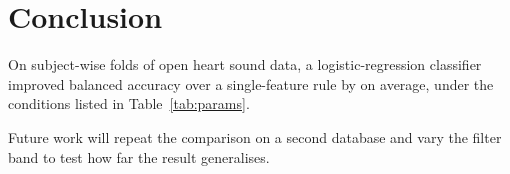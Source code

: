 \section{Conclusion}
\label{sec:conclusion}

On  subject-wise folds of open heart sound data, a logistic-regression
classifier improved balanced accuracy over a single-feature rule by  on
average, under the conditions listed in Table~\ref{tab:params}.

Future work will repeat the comparison on a second database and vary the filter band to test
how far the result generalises.
